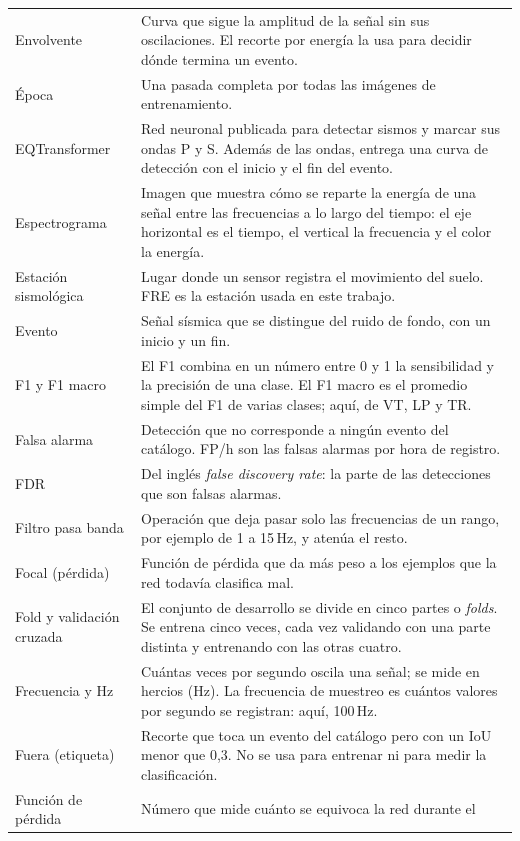 {\begin{longtable}{>{\raggedright\arraybackslash}p{3.4cm}>{\raggedright\arraybackslash}p{9.4cm}}
Envolvente & Curva que sigue la amplitud de la señal sin sus oscilaciones. El
recorte por energía la usa para decidir dónde termina un evento. \\
Época & Una pasada completa por todas las imágenes de entrenamiento. \\
EQTransformer & Red neuronal publicada para detectar sismos y marcar sus ondas
P y S. Además de las ondas, entrega una curva de detección con el inicio y el
fin del evento. \\
Espectrograma & Imagen que muestra cómo se reparte la energía de una señal
entre las frecuencias a lo largo del tiempo: el eje horizontal es el tiempo,
el vertical la frecuencia y el color la energía. \\
Estación sismológica & Lugar donde un sensor registra el movimiento del suelo.
FRE es la estación usada en este trabajo. \\
Evento & Señal sísmica que se distingue del ruido de fondo, con un inicio y un
fin. \\
F1 y F1 macro & El F1 combina en un número entre 0 y 1 la sensibilidad y la
precisión de una clase. El F1 macro es el promedio simple del F1 de varias
clases; aquí, de VT, LP y TR. \\
Falsa alarma & Detección que no corresponde a ningún evento del catálogo.
FP/h son las falsas alarmas por hora de registro. \\
FDR & Del inglés \emph{false discovery rate}: la parte de las detecciones que
son falsas alarmas. \\
Filtro pasa banda & Operación que deja pasar solo las frecuencias de un rango,
por ejemplo de 1 a 15\,Hz, y atenúa el resto. \\
Focal (pérdida) & Función de pérdida que da más peso a los ejemplos que la red
todavía clasifica mal. \\
Fold y validación cruzada & El conjunto de desarrollo se divide en cinco partes
o \emph{folds}. Se entrena cinco veces, cada vez validando con una parte
distinta y entrenando con las otras cuatro. \\
Frecuencia y Hz & Cuántas veces por segundo oscila una señal; se mide en
hercios (Hz). La frecuencia de muestreo es cuántos valores por segundo se
registran: aquí, 100\,Hz. \\
Fuera (etiqueta) & Recorte que toca un evento del catálogo pero con un IoU
menor que 0,3. No se usa para entrenar ni para medir la clasificación. \\
Función de pérdida & Número que mide cuánto se equivoca la red durante el

\end{longtable}}
